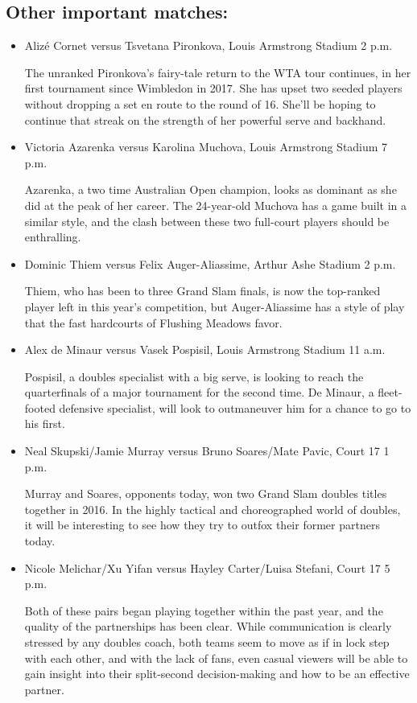 \hypertarget{other-important-matches}{%
\subsection{Other important matches:}\label{other-important-matches}}

\begin{itemize}
\item
  Alizé Cornet versus Tsvetana Pironkova, Louis Armstrong Stadium
  \textbar{} 2 p.m.

  The unranked Pironkova's fairy-tale return to the WTA tour continues,
  in her first tournament since Wimbledon in 2017. She has upset two
  seeded players without dropping a set en route to the round of 16.
  She'll be hoping to continue that streak on the strength of her
  powerful serve and backhand.
\item
  Victoria Azarenka versus Karolina Muchova, Louis Armstrong Stadium
  \textbar{} 7 p.m.

  Azarenka, a two time Australian Open champion, looks as dominant as
  she did at the peak of her career. The 24-year-old Muchova has a game
  built in a similar style, and the clash between these two full-court
  players should be enthralling.
\item
  Dominic Thiem versus Felix Auger-Aliassime, Arthur Ashe Stadium
  \textbar{} 2 p.m.

  Thiem, who has been to three Grand Slam finals, is now the top-ranked
  player left in this year's competition, but Auger-Aliassime has a
  style of play that the fast hardcourts of Flushing Meadows favor.
\item
  Alex de Minaur versus Vasek Pospisil, Louis Armstrong Stadium
  \textbar{} 11 a.m.

  Pospisil, a doubles specialist with a big serve, is looking to reach
  the quarterfinals of a major tournament for the second time. De
  Minaur, a fleet-footed defensive specialist, will look to outmaneuver
  him for a chance to go to his first.
\item
  Neal Skupski/Jamie Murray versus Bruno Soares/Mate Pavic, Court 17
  \textbar{} 1 p.m.

  Murray and Soares, opponents today, won two Grand Slam doubles titles
  together in 2016. In the highly tactical and choreographed world of
  doubles, it will be interesting to see how they try to outfox their
  former partners today.
\item
  Nicole Melichar/Xu Yifan versus Hayley Carter/Luisa Stefani, Court 17
  \textbar{} 5 p.m.

  Both of these pairs began playing together within the past year, and
  the quality of the partnerships has been clear. While communication is
  clearly stressed by any doubles coach, both teams seem to move as if
  in lock step with each other, and with the lack of fans, even casual
  viewers will be able to gain insight into their split-second
  decision-making and how to be an effective partner.
\end{itemize}

